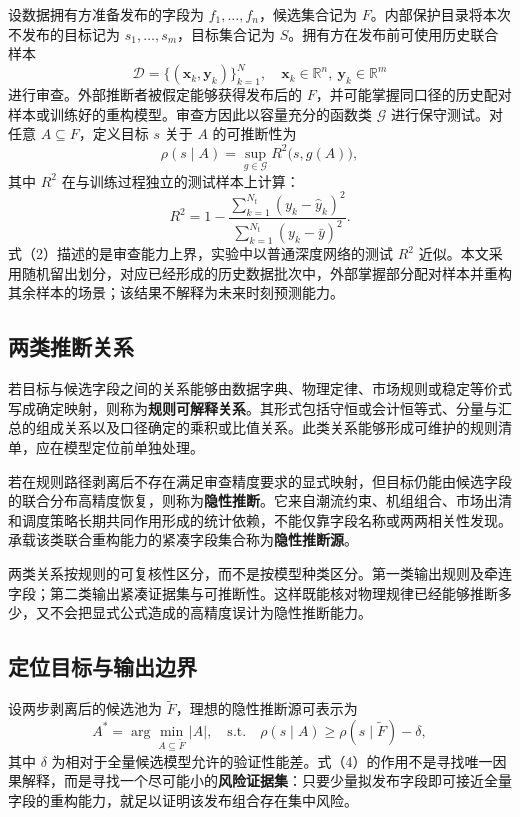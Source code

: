 \documentclass[UTF8,zihao=5,twoside,fontset=none]{ctexart}
\begin{document}
设数据拥有方准备发布的字段为 $f_1,\ldots,f_n$，候选集合记为 $F$。内部保护目录将本次不发布的目标记为 $s_1,\ldots,s_m$，目标集合记为 $S$。拥有方在发布前可使用历史联合样本
\begin{equation}
\mathcal D=\{(\bm x_k,\bm y_k)\}_{k=1}^{N},\quad \bm x_k\in\mathbb R^n,\ \bm y_k\in\mathbb R^m
\end{equation}
进行审查。外部推断者被假定能够获得发布后的 $F$，并可能掌握同口径的历史配对样本或训练好的重构模型。审查方因此以容量充分的函数类 $\mathcal G$ 进行保守测试。对任意 $A\subseteq F$，定义目标 $s$ 关于 $A$ 的可推断性为
\begin{equation}
\rho(s\mid A)=\sup_{g\in\mathcal G}R^2\big(s,g(A)\big),
\end{equation}
其中 $R^2$ 在与训练过程独立的测试样本上计算：
\begin{equation}
R^2=1-\frac{\sum_{k=1}^{N_t}(y_k-\hat y_k)^2}{\sum_{k=1}^{N_t}(y_k-\bar y)^2}.
\end{equation}
式（2）描述的是审查能力上界，实验中以普通深度网络的测试 $R^2$ 近似。本文采用随机留出划分，对应已经形成的历史数据批次中，外部掌握部分配对样本并重构其余样本的场景；该结果不解释为未来时刻预测能力。

\subsection{两类推断关系}

若目标与候选字段之间的关系能够由数据字典、物理定律、市场规则或稳定等价式写成确定映射，则称为\textbf{规则可解释关系}。其形式包括守恒或会计恒等式、分量与汇总的组成关系以及口径确定的乘积或比值关系。此类关系能够形成可维护的规则清单，应在模型定位前单独处理。

若在规则路径剥离后不存在满足审查精度要求的显式映射，但目标仍能由候选字段的联合分布高精度恢复，则称为\textbf{隐性推断}。它来自潮流约束、机组组合、市场出清和调度策略长期共同作用形成的统计依赖，不能仅靠字段名称或两两相关性发现。承载该类联合重构能力的紧凑字段集合称为\textbf{隐性推断源}。

两类关系按规则的可复核性区分，而不是按模型种类区分。第一类输出规则及牵连字段；第二类输出紧凑证据集与可推断性。这样既能核对物理规律已经能够推断多少，又不会把显式公式造成的高精度误计为隐性推断能力。

\subsection{定位目标与输出边界}

设两步剥离后的候选池为 $\widetilde F$，理想的隐性推断源可表示为
\begin{equation}
A^*=\arg\min_{A\subseteq\widetilde F}|A|,
\quad \mathrm{s.t.}\quad
\rho(s\mid A)\geq \rho(s\mid\widetilde F)-\delta,
\end{equation}
其中 $\delta$ 为相对于全量候选模型允许的验证性能差。式（4）的作用不是寻找唯一因果解释，而是寻找一个尽可能小的\textbf{风险证据集}：只要少量拟发布字段即可接近全量字段的重构能力，就足以证明该发布组合存在集中风险。
\end{document}
